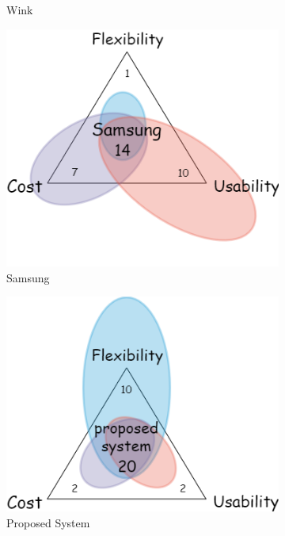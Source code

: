 \documentclass[12pt, oneside, a4paper]{book}
\begin{document}
\begin{figure}[H]
\begin{subfigure}[b]{.4\linewidth}
				\caption{Wink}
			\end{subfigure}
			\begin{subfigure}[b]{.4\linewidth}
				\includegraphics[width=\linewidth]{img/Samsung.png}
				\caption{Samsung}
			\end{subfigure}
			\begin{subfigure}[b]{.4\linewidth}
				\includegraphics[width=\linewidth]{img/proposed.png}
				\caption{Proposed System}
			\end{subfigure}
			\begin{subfigure}[b]{.4\linewidth}

\end{subfigure}
\end{figure}
\end{document}
